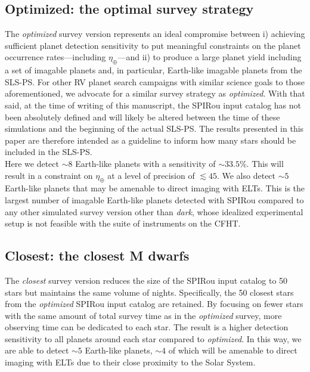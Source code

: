 \subsection{Optimized: the optimal survey strategy}
The \emph{optimized} survey version represents an ideal compromise between i) achieving sufficient planet
detection sensitivity to put meaningful constraints on the planet occurrence rates---including
$\eta_{\oplus}$---and ii) to produce a large planet yield including a set of imagable planets and, in
particular, Earth-like imagable planets from the SLS-PS. For other RV planet search campaigns with similar
science goals to those aforementioned, we advocate for a similar survey strategy as \emph{optimized}. With that
said, at the time of writing of this manuscript, the SPIRou input catalog has not been absolutely defined and
will likely be altered between the time of these
simulations and the beginning of the actual SLS-PS. The results presented in this paper are therefore intended as
a guideline to inform how many stars should be included in the SLS-PS. \\

Here we detect $\sim 8$ Earth-like planets with a sensitivity of $\sim 33.5$\%. This will result in a
constraint on $\eta_{\oplus}$ at a level of precision of $\lesssim 45$. We also detect $\sim 5$ Earth-like
planets that may be amenable to direct imaging with ELTs. This is the largest number of imagable Earth-like
planets detected with SPIRou compared to any other simulated survey version other than \emph{dark}, whose
idealized experimental setup is not feasible with the suite of instruments on the CFHT.

\subsection{Closest: the closest M dwarfs}
The \emph{closest} survey version reduces the size of the SPIRou input catalog to 50 stars but maintains
the same volume of nights. Specifically, the 50 closest stars from the \emph{optimized} SPIRou
input catalog are retained.
By focusing on fewer stars with the same amount of total survey time as in the \emph{optimized}
survey, more observing time can be dedicated to each star. The result is
a higher detection sensitivity to all planets around each star compared to \emph{optimized}.
In this way, we are able to detect $\sim 5$ Earth-like planets, $\sim 4$ of which will be amenable to
direct imaging with ELTs due to their close proximity to the Solar System.  \\

